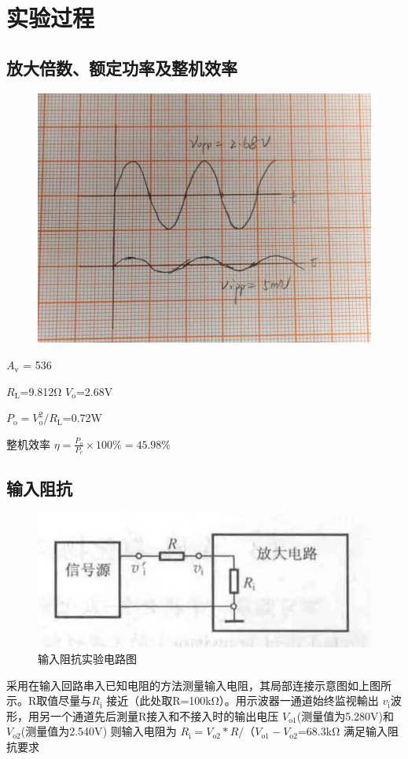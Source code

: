 \documentclass[a4paper,11pt,UTF8]{article}
\numberwithin{equation}{subsection}
\begin{document}
\section{实验过程}
\subsection{放大倍数、额定功率及整机效率}
	\begin{figure}[h]
		\centering
		\includegraphics[width=0.8\linewidth]{4.jpg}
	\end{figure}

$A_\mathrm{v}$ = 536

$R_\mathrm{L}$=9.812Ω  $V_\mathrm{o}$=2.68V 

$P_\mathrm{o}=V_\mathrm{o}^{2}/	R_\mathrm{L}$={0.72W}


整机效率 $\eta = \frac{P_o}{P_c} \times 100\% = 45.98\%$

\subsection{输入阻抗}
\begin{figure}[!ht ]
		\centering
		\includegraphics[width=0.8\linewidth]{2.jpg}
		\caption{输入阻抗实验电路图}
\end{figure}
采用在输入回路串入已知电阻的方法测量输入电阻，其局部连接示意图如上图所示。R取值尽量与$R_\mathrm{i}$ 接近（此处取R={100kΩ}）。用示波器一通道始终监视輸出	$v_\mathrm{i}$波形，用另一个通道先后測量R接入和不接入时的输出电压	$V_\mathrm{o1}$(测量值为{5.280V})和$V_\mathrm{o2}$(测量值为{2.540V})
则输入电阻为
$R_\mathrm{i} =V_\mathrm{o2}*R/（V_\mathrm{o1}-V_\mathrm{o2}$={68.3kΩ}  满足输入阻抗要求
\end{document}
